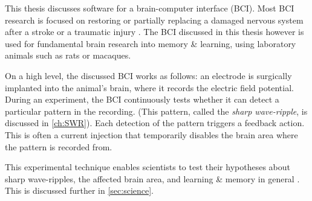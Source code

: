 \label{sec:BCI}

This thesis discusses software for a brain-computer interface (BCI).\footnotemark{} Most BCI research is focused on restoring or partially replacing a damaged nervous system after a stroke or a traumatic injury \cite{Krucoff2016}. The BCI discussed in this thesis however is used for fundamental brain research into memory \& learning, using laboratory animals such as rats or macaques.


On a high level, the discussed BCI works as follows: an electrode is surgically implanted into the animal's brain, where it records the electric field potential. During an experiment, the BCI continuously tests whether it can detect a particular pattern in the recording. (This pattern, called the \emph{sharp wave-ripple}, is discussed in \cref{ch:SWR}). Each detection of the pattern triggers a feedback action. This is often a current injection that temporarily disables the brain area where the pattern is recorded from.

This experimental technique enables scientists to test their hypotheses about sharp wave-ripples, the affected brain area, and learning \& memory in general \cite{Ego-Stengel2009,Girardeau2009,Jadhav2012,Girardeau2014,Talakoub2016}. This is discussed further in \cref{sec:science}.
